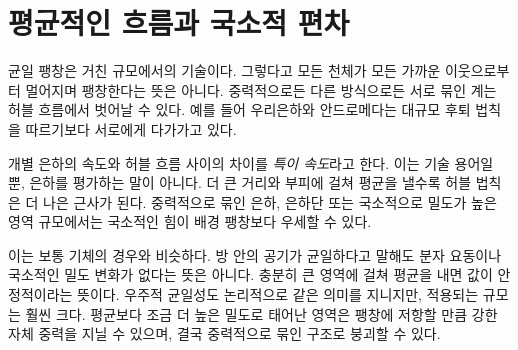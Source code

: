 \section{평균적인 흐름과 국소적 편차}

균일 팽창은 거친 규모에서의 기술이다. 그렇다고 모든 천체가 모든 가까운 이웃으로부터 멀어지며 팽창한다는 뜻은 아니다. 중력적으로든 다른 방식으로든 서로 묶인 계는 허블 흐름에서 벗어날 수 있다. 예를 들어 우리은하와 안드로메다는 대규모 후퇴 법칙을 따르기보다 서로에게 다가가고 있다.

개별 은하의 속도와 허블 흐름 사이의 차이를 \emph{특이 속도}라고 한다. 이는 기술 용어일 뿐, 은하를 평가하는 말이 아니다. 더 큰 거리와 부피에 걸쳐 평균을 낼수록 허블 법칙은 더 나은 근사가 된다. 중력적으로 묶인 은하, 은하단 또는 국소적으로 밀도가 높은 영역 규모에서는 국소적인 힘이 배경 팽창보다 우세할 수 있다.

\begin{classroomqa}
\end{classroomqa}

이는 보통 기체의 경우와 비슷하다. 방 안의 공기가 균일하다고 말해도 분자 요동이나 국소적인 밀도 변화가 없다는 뜻은 아니다. 충분히 큰 영역에 걸쳐 평균을 내면 값이 안정적이라는 뜻이다. 우주적 균일성도 논리적으로 같은 의미를 지니지만, 적용되는 규모는 훨씬 크다. 평균보다 조금 더 높은 밀도로 태어난 영역은 팽창에 저항할 만큼 강한 자체 중력을 지닐 수 있으며, 결국 중력적으로 묶인 구조로 붕괴할 수 있다.

\begin{classroomqa}
\end{classroomqa}

